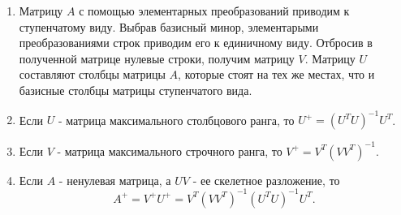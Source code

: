 \begin{enumerate}
    \item Матрицу $A$ с помощью элементарных преобразований приводим к ступенчатому виду. Выбрав базисный минор, элементарыми преобразованиями строк приводим его к единичному виду. Отбросив в полученной матрице нулевые строки, получим матрицу $V$. Матрицу $U$ составляют столбцы матрицы $A$, которые стоят на тех же местах, что и базисные столбцы матрицы ступенчатого вида.
    \item Если $U$ - матрица максимального столбцового ранга, то $U^+ = (U^TU)^{-1}U^T$.
    \item Если $V$ - матрица максимального строчного ранга, то $V^+ = V^T(VV^T)^{-1}$.
    \item Если $A$ - ненулевая матрица, а $UV$ - ее скелетное разложение, то
    $$A^+ = V^+U^+ = V^T(VV^T)^{-1}(U^TU)^{-1}U^T.$$
\end{enumerate}

